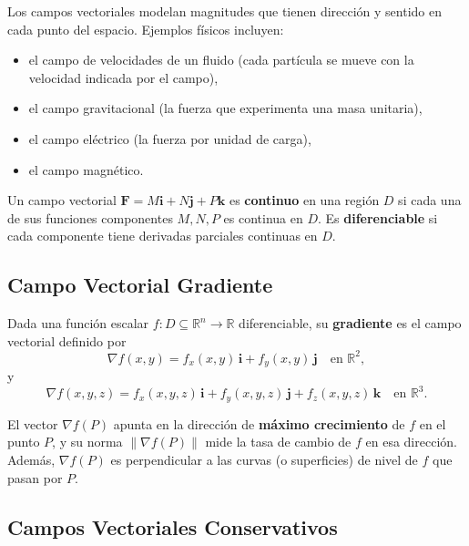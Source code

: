 \begin{rem}
Los campos vectoriales modelan magnitudes que tienen dirección y
sentido en cada punto del espacio. Ejemplos físicos incluyen:
\begin{itemize}
  \item el campo de velocidades de un fluido (cada partícula se mueve
  con la velocidad indicada por el campo),
  \item el campo gravitacional (la fuerza que experimenta una masa
  unitaria),
  \item el campo eléctrico (la fuerza por unidad de carga),
  \item el campo magnético.
\end{itemize}
\end{rem}

\begin{definition}
Un campo vectorial \(\mathbf{F} = M\mathbf{i}+N\mathbf{j}+P\mathbf{k}\)
es \textbf{continuo} en una región \(D\) si cada una de sus funciones
componentes \(M,N,P\) es continua en \(D\). Es \textbf{diferenciable}
si cada componente tiene derivadas parciales continuas en \(D\).
\end{definition}

\subsection*{Campo Vectorial Gradiente}

Dada una función escalar \(f: D \subseteq \mathbb{R}^n \to \mathbb{R}\)
diferenciable, su \textbf{gradiente} es el campo vectorial definido por
\[
\nabla f(x,y) = f_x(x,y)\,\mathbf{i} + f_y(x,y)\,\mathbf{j}
\quad \text{en } \mathbb{R}^2,
\]
y
\[
\nabla f(x,y,z) = f_x(x,y,z)\,\mathbf{i}
+ f_y(x,y,z)\,\mathbf{j}
+ f_z(x,y,z)\,\mathbf{k}
\quad \text{en } \mathbb{R}^3.
\]

\begin{rem}
El vector \(\nabla f(P)\) apunta en la dirección de \textbf{máximo
crecimiento} de \(f\) en el punto \(P\), y su norma
\(\|\nabla f(P)\|\) mide la tasa de cambio de \(f\) en esa dirección.
Además, \(\nabla f(P)\) es perpendicular a las curvas (o superficies)
de nivel de \(f\) que pasan por \(P\).
\end{rem}

\subsection*{Campos Vectoriales Conservativos}

